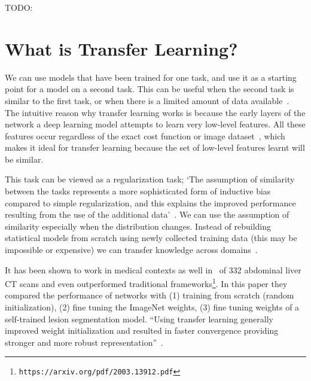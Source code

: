 \documentclass[11pt]{article}
\begin{document}


\tableofcontents

\clearpage

TODO:~\cite{concise-review-of-transfer-learning,comprehensive-survey-on-transfer-learning,what-is-being-transferred,transfer-learning-tutorial,transfer-learning-medium,transfer-learning-for-medical-image-classification-review,transfer-learning-in-medical-imaging,transfusion-medical-imaging,supervised-transfer-learning-at-scale,3d-medical-metric-analysis-2015, survey-on-transfer-learning}

\section{What is Transfer Learning?}

We can use models that have been trained for one task, and use it as a starting point for a model on a second task. This can be useful when the second task is similar to the first task, or when there is a limited amount of data available~\cite{geeks-transfer-learning}. The intuitive reason why transfer learning works is because the early layers of the network a deep learning model attempts to learn very low-level features. All these features occur regardless of the exact cost function or image dataset~\cite{geeks-transfer-learning}, which makes it ideal for transfer learning because the set of low-level features learnt will be similar.

\vspace{1em}

This task can be viewed as a regularization task; `The assumption of similarity between the tasks represents a more sophisticated form of inductive bias compared to simple regularization, and this explains the improved performance resulting from the use of the additional data'~\cite{deep-learning-book}. We can use the assumption of similarity especially when the distribution changes. Instead of rebuilding statistical models from scratch using newly collected training data (this may be impossible or expensive) we can transfer knowledge across domains~\cite{survey-on-transfer-learning}.

\vspace{1em}

It has been shown to work in medical contexts as well in~\cite{liver-lesion-via-transfer-learning} of 332 abdominal liver CT scans and even outperformed traditional frameworks\footnote{\texttt{https://arxiv.org/pdf/2003.13912.pdf}}. In this paper they compared the performance of networks with (1) training from scratch (random initialization), (2) fine tuning the ImageNet weights, (3) fine tuning weights of a self-trained lesion segmentation model. ``Using transfer learning generally improved weight initialization and resulted in faster convergence providing stronger and more robust representation''~\cite{liver-lesion-via-transfer-learning}.
\end{document}
